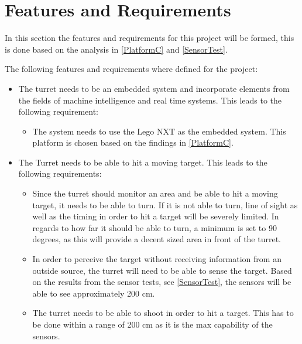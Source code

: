 \section{Features and Requirements}
In this section the features and requirements for this project will be formed,
this is done based on the analysis in \autoref{PlatformC} and
\autoref{SensorTest}.

The following features and requirements where defined for the project:
\begin{itemize}
  \item The turret needs to be an embedded system and incorporate elements from
  the fields of machine intelligence and real time systems. This leads to the
  following requirement:
  \begin{itemize}
    \item The system needs to use the Lego NXT as the embedded
    system. This platform is chosen based on the findings in
    \autoref{PlatformC}. 
  \end{itemize}
  \item The Turret needs to be able to hit a moving target. This leads to the
  following requirements:
  \begin{itemize}
    \item Since the turret should monitor an area and be able to hit a moving
    target, it needs to be able to turn. If it is not able to turn, line of
    sight as well as the timing in order to hit a target will be severely
    limited. In regards to how far it should be able to turn, a minimum is set
    to 90 degrees, as this will provide a decent sized area in front of the turret.
    \item In order to perceive the target without receiving information from an
    outside source, the turret will need to be able to sense the target. Based
    on the results from the sensor tests, see \autoref{SensorTest}, the sensors
    will be able to see approximately 200 cm.    
    \item The turret needs to be able to shoot in order to hit a
    target. This has to be done within a range of 200 cm as it is the max
    capability of the sensors. 
    

\end{itemize}
\end{itemize}
